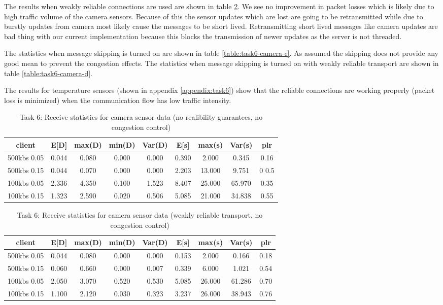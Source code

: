 The results when weakly reliable connections are used are shown in table
\ref{table:task6-camera-b}. We see no improvement in packet losses which is
likely due to high traffic volume of the camera sensors. Because of this the
sensor updates which are lost are going to be retransmitted while due to burstly
updates from camera most likely cause the messages to be short lived.
Retransmitting short lived messages like camera updates are bad thing with our
current implementation because this blocks the transmission of newer updates as
the server is not threaded.

The statistics when message skipping is turned on are shown in table
\ref{table:task6-camera-c}. As assumed the skipping does not provide any good
mean to prevent the congestion effects. The statistics when message skipping is turned on with weakly reliable transport are shown in table
\ref{table:task6-camera-d}.

The results for temperature sensors (shown in appendix \ref{appendix:task6})
show that the reliable connections are working properly (packet loss is
minimized) when the communication flow has low traffic intensity.


\begin{table}
\centering
\begin{tabular}{|c|c|c|c|c|c|c|c|c|}
\hline
client & E[D] & max(D) & min(D) & Var(D) & E[s] & max(s) & Var(s) & plr\\
\hline
500kbs 0.05 & 0.044 & 0.080 & 0.000 & 0.000 & 0.390 & 2.000 & 0.345 & 0.16\\
\hline
500kbs 0.15 & 0.044 & 0.070 & 0.000 & 0.000 & 2.203 & 13.000 &9.751 & 0 0.5 \\
\hline
100kbs 0.05 & 2.336 & 4.350 & 0.100 & 1.523 & 8.407 & 25.000 & 65.970 & 0.35 \\
\hline
100kbs 0.15 & 1.323 & 2.590 & 0.020 & 0.506 & 5.085 & 21.000 & 34.838 & 0.55 \\
\hline
\end{tabular}
\caption{Task 6: Receive statistics for camera sensor data (no realibility guarantees, no congestion control)}
\label{table:task6-camera-a}
\end{table}

\begin{table}
\centering
\begin{tabular}{|c|c|c|c|c|c|c|c|c|}
\hline
client & E[D] & max(D) & min(D) & Var(D) & E[s] & max(s) & Var(s) & plr\\
\hline
500kbs 0.05 & 0.044 & 0.080 & 0.000 & 0.000 & 0.153 & 2.000 & 0.166 & 0.18 \\
\hline
500kbs 0.15 & 0.060 & 0.660 & 0.000 & 0.007 & 0.339 & 6.000 & 1.021 & 0.54 \\
\hline
100kbs 0.05 & 2.050 & 3.070 & 0.520 & 0.530 & 5.085 & 26.000 & 61.286 & 0.70 \\
\hline
100kbs 0.15 & 1.100 & 2.120 & 0.030 & 0.323 & 3.237 & 26.000 & 38.943 & 0.76 \\
\hline
\end{tabular}
\caption{Task 6: Receive statistics for camera sensor data (weakly reliable transport, no congestion control)}
\label{table:task6-camera-b}
\end{table}


